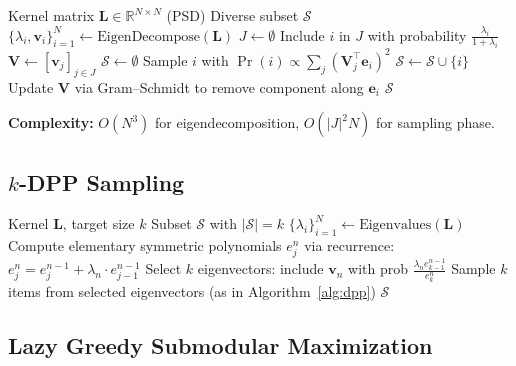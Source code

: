 \documentclass[11pt]{article}
\begin{document}
\begin{algorithm}[H]
\caption{Exact DPP Sampling~\citep{hough2006determinantal}}
\label{alg:dpp}
\begin{algorithmic}[1]
\Require Kernel matrix $\mathbf{L} \in \mathbb{R}^{N\times N}$ (PSD)
\Ensure Diverse subset $\mathcal{S}$
\State $\{\lambda_i, \mathbf{v}_i\}_{i=1}^N \gets \text{EigenDecompose}(\mathbf{L})$
\State $J \gets \emptyset$
  \State Include $i$ in $J$ with probability $\frac{\lambda_i}{1 + \lambda_i}$
\EndFor
\State $\mathbf{V} \gets [\mathbf{v}_j]_{j \in J}$ 
\State $\mathcal{S} \gets \emptyset$
  \State Sample $i$ with $\Pr(i) \propto \sum_j (\mathbf{V}_j^\top \mathbf{e}_i)^2$
  \State $\mathcal{S} \gets \mathcal{S} \cup \{i\}$
  \State Update $\mathbf{V}$ via Gram--Schmidt to remove component along $\mathbf{e}_i$
\EndWhile
\State \Return $\mathcal{S}$
\end{algorithmic}
\end{algorithm}

\textbf{Complexity:} $O(N^3)$ for eigendecomposition, $O(|J|^2 N)$ for
sampling phase.

\subsection{$k$-DPP Sampling}

\begin{algorithm}[H]
\caption{$k$-DPP Sampling via Elementary Symmetric Polynomials~\citep{kulesza2011kdpp}}
\label{alg:kdpp}
\begin{algorithmic}[1]
\Require Kernel $\mathbf{L}$, target size $k$
\Ensure Subset $\mathcal{S}$ with $|\mathcal{S}| = k$
\State $\{\lambda_i\}_{i=1}^N \gets \text{Eigenvalues}(\mathbf{L})$
\State Compute elementary symmetric polynomials $e_j^n$ via recurrence:
\State \quad $e_j^n = e_j^{n-1} + \lambda_n \cdot e_{j-1}^{n-1}$
\State Select $k$ eigenvectors: include $\mathbf{v}_n$ with prob $\frac{\lambda_n e_{k-1}^{n-1}}{e_k^n}$
\State Sample $k$ items from selected eigenvectors (as in Algorithm~\ref{alg:dpp})
\State \Return $\mathcal{S}$
\end{algorithmic}
\end{algorithm}

\subsection{Lazy Greedy Submodular Maximization}
\end{document}
